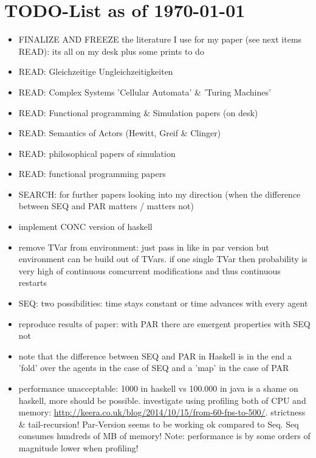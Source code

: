 \section{TODO-List as of \today}

\begin{itemize}
\item FINALIZE AND FREEZE the literature I use for my paper (see next items READ): its all on my desk plus some prints to do
\item READ: Gleichzeitige Ungleichzeitigkeiten
\item READ: Complex Systems 'Cellular Automata' \& 'Turing Machines'
\item READ: Functional programming \& Simulation papers (on desk)
\item READ: Semantics of Actors (Hewitt, Greif \& Clinger)
\item READ: philosophical papers of simulation
\item READ: functional programming papers
\item SEARCH: for further papers looking into my direction (when the difference between SEQ and PAR matters / matters not)

\item implement CONC version of haskell

\item remove TVar from environment: just pass in like in par version but environment can be build out of TVars. if one single TVar then probability is very high of continuous comcurrent modifications and thus continuous restarts

\item SEQ: two possibilities: time stays constant or time advances with every agent

\item reproduce results of paper: with PAR there are emergent properties with SEQ not

\item note that the difference between SEQ and PAR in Haskell is in the end a 'fold' over the agents in the case of SEQ and a 'map' in the case of PAR
\item performance unacceptable: 1000 in haskell vs 100.000 in java is a shame on haskell, more should be possible. investigate using profiling both of CPU and memory: \url{http://keera.co.uk/blog/2014/10/15/from-60-fps-to-500/}. strictness \& tail-recursion!
	Par-Version seems to be working ok compared to Seq. Seq consumes hundreds of MB of memory!
	Note: performance is by some orders of magnitude lower when profiling!


\end{itemize}
